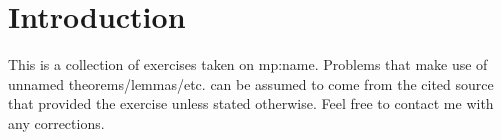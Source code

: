 \chapter*{Introduction}
This is a collection of exercises taken on {mp:name}. Problems that make use
of unnamed theorems/lemmas/etc. can be assumed to come from the cited source
that provided the exercise unless stated otherwise. Feel free to contact me 
with any corrections.